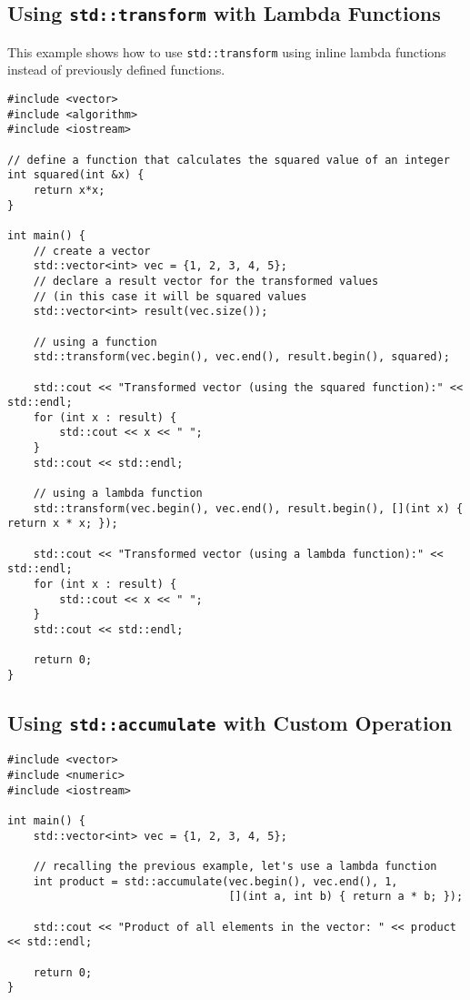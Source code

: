\documentclass{article}
\begin{document}
\subsection*{Using \texttt{std::transform} with Lambda Functions}
This example shows how to use \texttt{std::transform} using inline lambda functions instead of previously defined functions.
\begin{verbatim}
#include <vector>
#include <algorithm>
#include <iostream>

// define a function that calculates the squared value of an integer
int squared(int &x) {
    return x*x;
}

int main() {
    // create a vector
    std::vector<int> vec = {1, 2, 3, 4, 5};
    // declare a result vector for the transformed values
    // (in this case it will be squared values
    std::vector<int> result(vec.size());

    // using a function
    std::transform(vec.begin(), vec.end(), result.begin(), squared);

    std::cout << "Transformed vector (using the squared function):" << std::endl;
    for (int x : result) {
        std::cout << x << " ";
    }
    std::cout << std::endl;

    // using a lambda function
    std::transform(vec.begin(), vec.end(), result.begin(), [](int x) { return x * x; });

    std::cout << "Transformed vector (using a lambda function):" << std::endl;
    for (int x : result) {
        std::cout << x << " ";
    }
    std::cout << std::endl;

    return 0;
}
\end{verbatim}

\subsection*{Using \texttt{std::accumulate} with Custom Operation}
\begin{verbatim}
#include <vector>
#include <numeric>
#include <iostream>

int main() {
    std::vector<int> vec = {1, 2, 3, 4, 5};

    // recalling the previous example, let's use a lambda function
    int product = std::accumulate(vec.begin(), vec.end(), 1,
                                  [](int a, int b) { return a * b; });

    std::cout << "Product of all elements in the vector: " << product << std::endl;

    return 0;
}
\end{verbatim}
\end{document}
